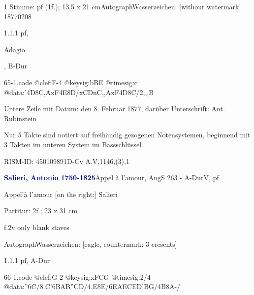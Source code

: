 \documentclass[a4paper, twocolumn, 11pt]{book}
\begin{document}
\par \begin{itshape}\end{itshape} 
\par \textcolor{darkblue}{}  1 Stimme: pf  (1f.); 13,5 x 21 cm\newline Autograph\newline Wasserzeichen: [without watermark]  18770208
\par 1.1.1  pf, \begin{itshape}Adagio\end{itshape}, B-Dur  
\begin{filecontents*}{65-1.code}
@clef:F-4
@keysig:bBE
@timesig:c
@data:'4D8{C,A}xF4E8D/{xCDnC,,A}xF4D8C/2,,,B
\end{filecontents*}
\newline %
\par Untere Zeile mit Datum: {\textquotedbl}den 8. Februar 1877{\textquotedbl}, darüber Unterschrift: {\textquotedbl}Ant. Rubinstein{\textquotedbl}
\par Nur 5 Takte sind notiert auf freihändig gezogenen Notensystemen, beginnend mit 3 Takten im unteren System im Bassschlüssel.
\par RISM-ID: 450109891\newline D-Cv  A.V,1146,(3),1
\par \vspace{16pt} \textcolor{darkblue}{\textbf{Salieri, Antonio  1750-1825}}\hfillplus{[66]}\newline Appel à l'amour, AngS 263 - A-Dur\newline V, pf
\par \begin{itshape}[heading:] Appel'à l'amour [on the right:] Salieri\end{itshape} 
\par \textcolor{darkblue}{}  Partitur: 2f.; 23 x 31 cm\newline \begin{small} f.2v only blank staves\end{small} \newline Autograph\newline Wasserzeichen: [eagle, countermark: 3 cresents]
\par 1.1.1  pf, A-Dur  
\begin{filecontents*}{66-1.code}
@clef:G-2
@keysig:xFCG
@timesig:2/4
@data:''6C/{8.C'6B}{AB''CD}/4.E8E/6{EAEC}{ED'BG}/4B8A-/
\end{filecontents*}
\end{document}
